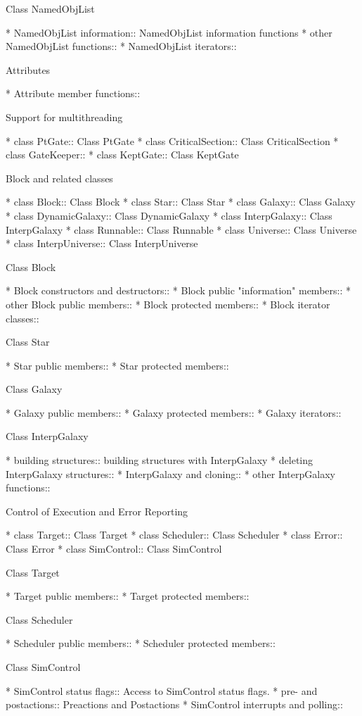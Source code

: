 \begin{menu}
Class NamedObjList

* NamedObjList information::	NamedObjList information functions
* other NamedObjList functions::  
* NamedObjList iterators::	

Attributes

* Attribute member functions::	

Support for multithreading

* class PtGate::		Class PtGate
* class CriticalSection::	Class CriticalSection
* class GateKeeper::		
* class KeptGate::		Class KeptGate

Block and related classes

* class Block::			Class Block
* class Star::			Class Star
* class Galaxy::		Class Galaxy
* class DynamicGalaxy::		Class DynamicGalaxy
* class InterpGalaxy::		Class InterpGalaxy
* class Runnable::		Class Runnable
* class Universe::		Class Universe
* class InterpUniverse::	Class InterpUniverse

Class Block

* Block constructors and destructors::	
* Block public "information" members::	
* other Block public members::	
* Block protected members::	
* Block iterator classes::	

Class Star

* Star public members::		
* Star protected members::	

Class Galaxy

* Galaxy public members::	
* Galaxy protected members::	
* Galaxy iterators::		

Class InterpGalaxy

* building structures::		building structures with InterpGalaxy
* deleting InterpGalaxy structures::  
* InterpGalaxy and cloning::	
* other InterpGalaxy functions::  

Control of Execution and Error Reporting

* class Target::		Class Target
* class Scheduler::		Class Scheduler
* class Error::			Class Error
* class SimControl::		Class SimControl

Class Target

* Target public members::	
* Target protected members::	

Class Scheduler

* Scheduler public members::	
* Scheduler protected members::	 

Class SimControl

* SimControl status flags::	Access to SimControl status flags.
* pre- and postactions::	Preactions and Postactions
* SimControl interrupts and polling::  


\end{menu}
